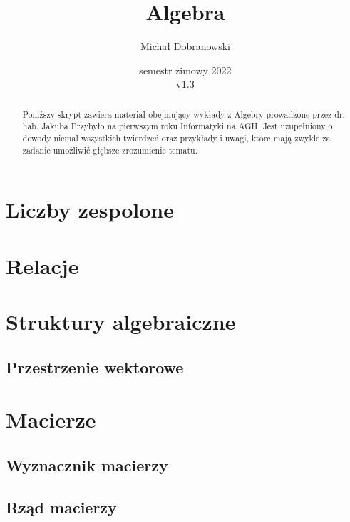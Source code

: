 \documentclass[polish,pretty]{angav}
\title{Algebra}
\author{Michał Dobranowski}
\date{semestr zimowy 2022 \\ v1.3}
\begin{document}
    \maketitle
    \begin{abstract}
        \noindent Poniższy skrypt zawiera materiał obejmujący wykłady z Algebry prowadzone przez dr. hab. Jakuba Przybyło na pierwszym roku Informatyki na AGH. Jest uzupełniony o dowody niemal wszystkich twierdzeń oraz przykłady i uwagi, które mają zwykle za zadanie umożliwić głębsze zrozumienie tematu.
    \end{abstract}
    \vspace*{\fill}
    {\footnotesize\doclicenseThis}
    \newpage

    \tableofcontents
    \newpage

    \section{Liczby zespolone}
    

    \section{Relacje}
    

    \section{Struktury algebraiczne}
    

        \subsection{Przestrzenie wektorowe}
        

    \section{Macierze}
    

        \subsection{Wyznacznik macierzy}
        

        \subsection{Rząd macierzy}
        
\end{document}
